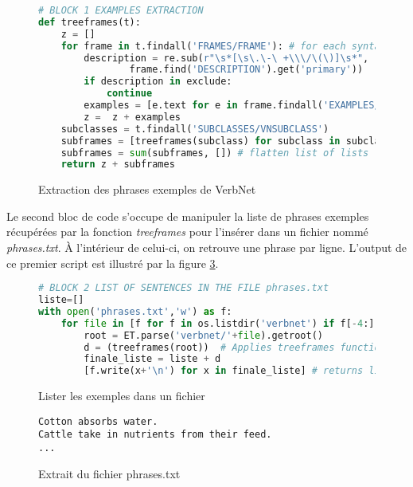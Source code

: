 \begin{figure}[htb]
  \caption{Extraction des phrases exemples de VerbNet}
	\label{lst:example1}
\begin{lstlisting}[language=Python]
# BLOCK 1 EXAMPLES EXTRACTION
def treeframes(t):
    z = []
    for frame in t.findall('FRAMES/FRAME'): # for each syntactic frame
        description = re.sub(r"\s*[\s\.\-\ +\\\/\(\)]\s*", '_',
				frame.find('DESCRIPTION').get('primary'))
        if description in exclude:
            continue    
        examples = [e.text for e in frame.findall('EXAMPLES/EXAMPLE')] # get the examples
        z =  z + examples 
    subclasses = t.findall('SUBCLASSES/VNSUBCLASS')
    subframes = [treeframes(subclass) for subclass in subclasses] #repeat operation for subclasses
    subframes = sum(subframes, []) # flatten list of lists
    return z + subframes
\end{lstlisting}
\end{figure}

Le second bloc de code s'occupe de manipuler la liste de phrases exemples récupérées par la fonction \emph{treeframes} pour l'insérer dans un fichier nommé \emph{phrases.txt}. À l'intérieur de celui-ci, on retrouve une phrase par ligne. L'output de ce premier script est illustré par la figure \ref{lst:example3}.

\begin{figure}[htb]
  \caption{Lister les exemples dans un fichier}
	\label{lst:example2}
\begin{lstlisting}[language=Python]
# BLOCK 2 LIST OF SENTENCES IN THE FILE phrases.txt
liste=[]
with open('phrases.txt','w') as f:
    for file in [f for f in os.listdir('verbnet') if f[-4:] == '.xml']:
        root = ET.parse('verbnet/'+file).getroot()       
        d = (treeframes(root))  # Applies treeframes function to all of VerbNet files
        finale_liste = liste + d  
        [f.write(x+'\n') for x in finale_liste] # returns line after each example
\end{lstlisting}
\end{figure}

\begin{figure}[htb]
  \caption{Extrait du fichier phrases.txt}
	\label{lst:example3}
\begin{lstlisting}[language=mate]
Cotton absorbs water.
Cattle take in nutrients from their feed.
...
\end{lstlisting}
\end{figure}

